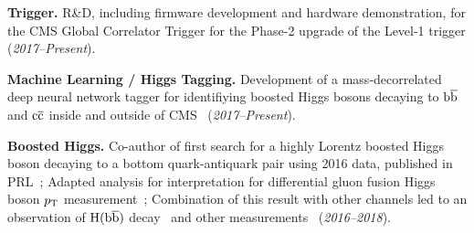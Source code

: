 \documentclass[11pt]{res}
\begin{document}
\begin{resume}
\textbf{Trigger.} R\&D, including firmware development and hardware demonstration, for
the CMS Global Correlator Trigger for the Phase-2 upgrade of the
Level-1 trigger (\emph{2017--Present}).

\textbf{Machine Learning / Higgs Tagging.} Development of a mass-decorrelated deep neural network tagger
  for identifiying boosted Higgs bosons decaying to $\mathrm{b}\overline{\mathrm{b}}$ and $\mathrm{c}\overline{\mathrm{c}}$ inside and outside of  CMS~\cite{Moreno:2019neq,Moreno:2019bmu,neurips2019_hbb,CMS-DP-2018-046}
  (\textit{2017--Present}).


\textbf{Boosted Higgs.} Co-author of first search for a highly Lorentz boosted Higgs boson
  decaying to a bottom quark-antiquark pair using 2016 data, published in
  PRL~\cite{Sirunyan:2017dgc}; Adapted analysis for interpretation for differential gluon fusion Higgs boson $p_{\mathrm{T}}$ measurement~\cite{Sirunyan:2018sgc}; Combination of this result with other channels led to an observation of $\mathrm{H}(\mathrm{b}\overline{\mathrm{b}})$ decay~\cite{Sirunyan:2018kst} and other measurements~\cite{Sirunyan:2018koj} (\textit{2016--2018}).


\end{resume}
\end{document}
